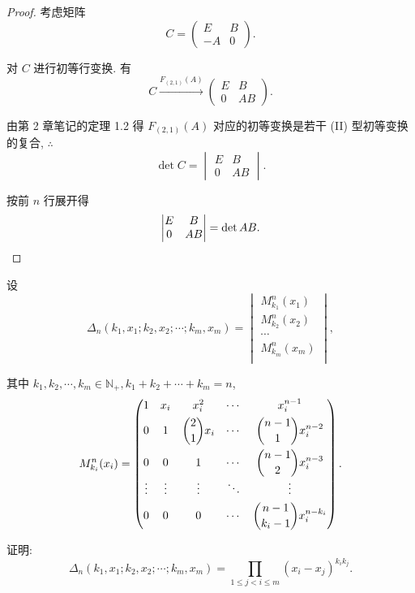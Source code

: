 \documentclass[color=black,device=normal,lang=cn,mode=geye]{elegantnote}
\begin{document}
\begin{proof}
    考虑矩阵
    \[C=\begin{pmatrix}
        E & B \\
        -A & 0
    \end{pmatrix}.\]

    对 $C$ 进行初等行变换. 有
    \[C\xrightarrow{F_{(2,1)}(A)}\begin{pmatrix}
        E & B \\
        0 & AB
    \end{pmatrix}.\]

    由第 2 章笔记的定理 1.2 得 $F_{(2,1)}(A)$ 对应的初等变换是若干 (II) 型初等变换的复合, $\therefore$
    \[\det C=\begin{vmatrix}
        E & B \\
        0 & AB
    \end{vmatrix}.\]

    按前 $n$ 行展开得
    \[\begin{vmatrix}
        E & B \\
        0 & AB
    \end{vmatrix}=\det AB.\qedhere\]
\end{proof}
\begin{exercise}%
    设
    \[\Delta_n(k_1,x_1;k_2,x_2;\cdots;k_m,x_m)=\begin{vmatrix}
        M_{k_1}^n(x_1) \\
        M_{k_2}^n(x_2) \\
        \cdots \\
        M_{k_m}^n(x_m) \\
    \end{vmatrix},\]

    其中 $k_1,k_2,\cdots,k_m\in\mathbb{N}_+,k_1+k_2+\cdots+k_m=n$,
    \[M_{k_i}^n(x_i)=\begin{pmatrix}
        1 & x_i & x_i^2 & \cdots & x_i^{n-1} \\[4pt]
        0 & 1 & \dbinom{2}{1}x_i & \cdots & \dbinom{n-1}{1}x_i^{n-2} \\[10pt]
        0 & 0 & 1 & \cdots & \dbinom{n-1}{2}x_i^{n-3} \\
        \vdots & \vdots & \vdots & \ddots & \vdots \\[4pt]
        0 & 0 & 0 & \cdots & \dbinom{n-1}{k_i-1}x_i^{n-k_i} \\
    \end{pmatrix}.\]

    证明:
    \[\Delta_n(k_1,x_1;k_2,x_2;\cdots;k_m,x_m)=\prod\limits_{1\leq j<i\leq m}(x_i-x_j)^{k_ik_j}.\]
\end{exercise}
\end{document}
